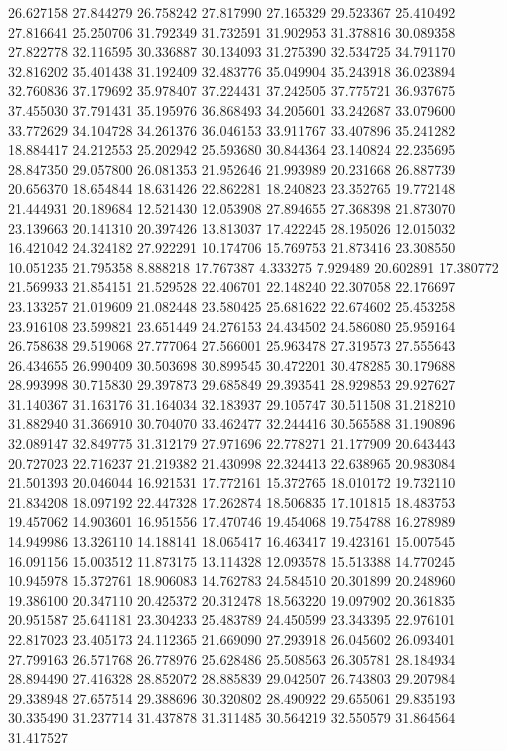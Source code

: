 26.627158
27.844279
26.758242
27.817990
27.165329
29.523367
25.410492
27.816641
25.250706
31.792349
31.732591
31.902953
31.378816
30.089358
27.822778
32.116595
30.336887
30.134093
31.275390
32.534725
34.791170
32.816202
35.401438
31.192409
32.483776
35.049904
35.243918
36.023894
32.760836
37.179692
35.978407
37.224431
37.242505
37.775721
36.937675
37.455030
37.791431
35.195976
36.868493
34.205601
33.242687
33.079600
33.772629
34.104728
34.261376
36.046153
33.911767
33.407896
35.241282
18.884417
24.212553
25.202942
25.593680
30.844364
23.140824
22.235695
28.847350
29.057800
26.081353
21.952646
21.993989
20.231668
26.887739
20.656370
18.654844
18.631426
22.862281
18.240823
23.352765
19.772148
21.444931
20.189684
12.521430
12.053908
27.894655
27.368398
21.873070
23.139663
20.141310
20.397426
13.813037
17.422245
28.195026
12.015032
16.421042
24.324182
27.922291
10.174706
15.769753
21.873416
23.308550
10.051235
21.795358
8.888218
17.767387
4.333275
7.929489
20.602891
17.380772
21.569933
21.854151
21.529528
22.406701
22.148240
22.307058
22.176697
23.133257
21.019609
21.082448
23.580425
25.681622
22.674602
25.453258
23.916108
23.599821
23.651449
24.276153
24.434502
24.586080
25.959164
26.758638
29.519068
27.777064
27.566001
25.963478
27.319573
27.555643
26.434655
26.990409
30.503698
30.899545
30.472201
30.478285
30.179688
28.993998
30.715830
29.397873
29.685849
29.393541
28.929853
29.927627
31.140367
31.163176
31.164034
32.183937
29.105747
30.511508
31.218210
31.882940
31.366910
30.704070
33.462477
32.244416
30.565588
31.190896
32.089147
32.849775
31.312179
27.971696
22.778271
21.177909
20.643443
20.727023
22.716237
21.219382
21.430998
22.324413
22.638965
20.983084
21.501393
20.046044
16.921531
17.772161
15.372765
18.010172
19.732110
21.834208
18.097192
22.447328
17.262874
18.506835
17.101815
18.483753
19.457062
14.903601
16.951556
17.470746
19.454068
19.754788
16.278989
14.949986
13.326110
14.188141
18.065417
16.463417
19.423161
15.007545
16.091156
15.003512
11.873175
13.114328
12.093578
15.513388
14.770245
10.945978
15.372761
18.906083
14.762783
24.584510
20.301899
20.248960
19.386100
20.347110
20.425372
20.312478
18.563220
19.097902
20.361835
20.951587
25.641181
23.304233
25.483789
24.450599
23.343395
22.976101
22.817023
23.405173
24.112365
21.669090
27.293918
26.045602
26.093401
27.799163
26.571768
26.778976
25.628486
25.508563
26.305781
28.184934
28.894490
27.416328
28.852072
28.885839
29.042507
26.743803
29.207984
29.338948
27.657514
29.388696
30.320802
28.490922
29.655061
29.835193
30.335490
31.237714
31.437878
31.311485
30.564219
32.550579
31.864564
31.417527
